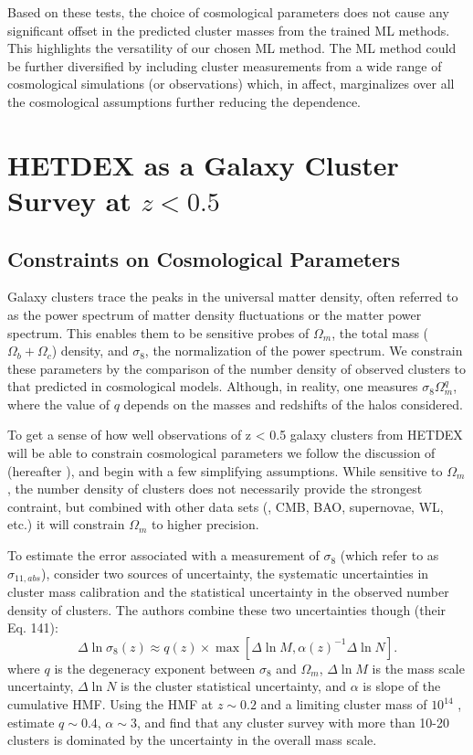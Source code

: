 \documentclass[fleqn,usenatbib]{mnras}
\begin{document}
Based on these tests, the choice of cosmological parameters does not cause any significant offset in the predicted cluster masses from the trained ML methods. This highlights the versatility of our chosen ML method. The ML method could be further diversified by including cluster measurements from a wide range of cosmological simulations (or observations) which, in affect, marginalizes over all the cosmological assumptions further reducing the dependence.

\section{HETDEX as a Galaxy Cluster Survey at $z < 0.5$}\label{sec:discussion}

\subsection{Constraints on Cosmological Parameters}
Galaxy clusters trace the peaks in the universal matter density, often referred to as the power spectrum of matter density fluctuations or the matter power spectrum. This enables them to be sensitive probes of $\Omega_m$, the total mass ($\Omega_b + \Omega_c$) density, and $\sigma_8$, the normalization of the power spectrum. We constrain these parameters by the comparison of the number density of observed clusters to that predicted in cosmological models. Although, in reality, one measures $\sigma_8\Omega_m^q$, where the value of $q$ depends on the masses and redshifts of the halos considered.

To get a sense of how well observations of z < 0.5 galaxy clusters from HETDEX will be able to constrain cosmological parameters we follow the discussion of \cite{Weinberg2013} (hereafter ), and begin with a few simplifying assumptions. While sensitive to $\Omega_m$, the number density of clusters does not necessarily provide the strongest contraint, but combined with other data sets (\eg, CMB, BAO, supernovae, WL, etc.) it will constrain $\Omega_m$ to higher precision.

To estimate the error associated with a measurement of $\sigma_8$ (which  refer to as $\sigma_{11,abs}$),  consider two sources of uncertainty, the systematic uncertainties in cluster mass calibration and the statistical uncertainty in the observed number density of clusters. The authors combine these two uncertainties though (their Eq. 141):
\begin{equation}
\Delta \ln \sigma_8(z) \approx q(z)\times 
        \max\left[ \Delta \ln M, \alpha(z)^{-1} \Delta \ln N \right].
\label{eq:sigElapprox}
\end{equation}
where $q$ is the degeneracy exponent between $\sigma_8$ and $\Omega_m$, $\Delta \ln M$ is the mass scale uncertainty, $\Delta \ln N$ is the cluster statistical uncertainty, and $\alpha$ is slope of the cumulative HMF. Using the \cite{Tinker2008} HMF at $z\sim0.2$ and a limiting cluster mass of $10^{14}$ \Msol,  estimate $q\sim0.4$, $\alpha\sim3$, and find that any cluster survey with more than 10-20 clusters is dominated by the uncertainty in the overall mass scale.
\end{document}
